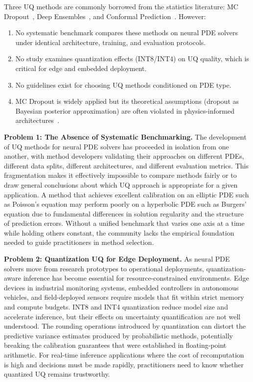 \documentclass[12pt,a4paper]{article}
\theoremstyle{plain}
\begin{document}
Three UQ methods are commonly borrowed from the statistics literature:
MC Dropout~\citep{gal2016dropout,graves2011practical,molchanov2017variational},
Deep Ensembles~\citep{lakshminarayanan2017simple,blundell2015weight},
and Conformal Prediction~\citep{barber2023conformal,shafer2008/tutorial,lei2018distribution}.
However:
\begin{enumerate}
    \item No systematic benchmark compares these methods on neural PDE solvers
        under identical architecture, training, and evaluation protocols.
    \item No study examines quantization effects (INT8/INT4) on UQ quality,
        which is critical for edge and embedded deployment.
    \item No guidelines exist for choosing UQ methods conditioned on PDE type.
    \item MC Dropout is widely applied but its theoretical assumptions
        (dropout as Bayesian posterior approximation) are often violated in
        physics-informed architectures~\citep{kingma2014autoencoding,blundell2015weight,yang2021generalized}.
\end{enumerate}

\textbf{Problem 1: The Absence of Systematic Benchmarking.}
The development of UQ methods for neural PDE solvers has proceeded in
isolation from one another, with method developers validating their
approaches on different PDEs, different data splits, different architectures,
and different evaluation metrics. This fragmentation makes it effectively
impossible to compare methods fairly or to draw general conclusions about
which UQ approach is appropriate for a given application. A method that
achieves excellent calibration on an elliptic PDE such as Poisson's equation
may perform poorly on a hyperbolic PDE such as Burgers' equation due to
fundamental differences in solution regularity and the structure of
prediction errors. Without a unified benchmark that varies one axis at a
time while holding others constant, the community lacks the empirical
foundation needed to guide practitioners in method selection.

\textbf{Problem 2: Quantization UQ for Edge Deployment.}
As neural PDE solvers move from research prototypes to operational
deployments, quantization-aware inference has become essential for
resource-constrained environments. Edge devices in industrial monitoring
systems, embedded controllers in autonomous vehicles, and field-deployed
sensors require models that fit within strict memory and compute budgets.
INT8 and INT4 quantization reduce model size and accelerate inference,
but their effects on uncertainty quantification are not well understood.
The rounding operations introduced by quantization can distort the
predictive variance estimates produced by probabilistic methods,
potentially breaking the calibration guarantees that were established
in floating-point arithmetic. For real-time inference applications where
the cost of recomputation is high and decisions must be made rapidly,
practitioners need to know whether quantized UQ remains trustworthy.
\end{document}
